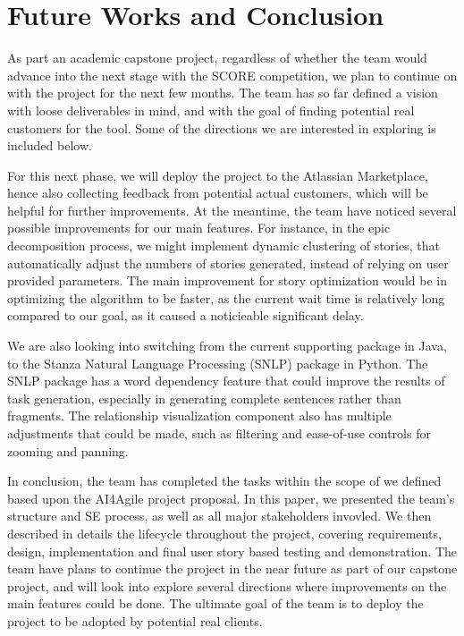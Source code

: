 \section{Future Works and Conclusion}
\label{conlcusion}
As part an academic capstone project, regardless of whether the team would advance into the next stage with the SCORE competition, we plan to continue on with the project for the next few months. The team has so far defined a vision with loose deliverables in mind, and with the goal of finding potential real customers for the tool. Some of the directions we are interested in exploring is included below. 

For this next phase, we will deploy the project to the Atlassian Marketplace, hence also collecting feedback from potential actual customers, which will be helpful for further improvements.  
At the meantime, the team have noticed several possible improvements for our main features. For instance, in the epic decomposition process, we might implement dynamic clustering of stories, that automatically adjust the numbers of stories generated, instead of relying on user provided parameters. The main improvement for story optimization would be in optimizing the algorithm to be faster, as the current wait time is relatively long compared to our goal, as it caused a noticieable significant delay. 

We are also looking into switching from the current supporting package in Java, to the Stanza Natural Language Processing (SNLP) \cite{NLP1} package in Python. The SNLP package has a word dependency feature that could improve the results of task generation, especially in generating complete sentences rather than fragments. The relationship visualization component also has multiple adjustments that could be made, such as filtering and ease-of-use controls for zooming and panning. 

In conclusion, the team has completed the tasks within the scope of we defined based upon the AI4Agile project proposal. In this paper, we presented the team's structure and SE process, as well as all major stakeholders invovled. We then described in details the lifecycle throughout the project, covering requirements, design, implementation and final user story based testing and demonstration. The team have plans to continue the project in the near future as part of our capstone project, and will look into explore several directions where improvements on the main features could be done. The ultimate goal of the team is to deploy the project to be adopted by potential real clients. 